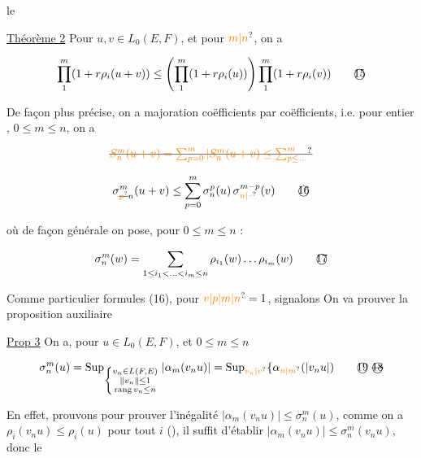  le

\uline{Théorème 2} Pour $u,v\in L_0(E,F)$,  et pour  $\unsure{m|n}$, on a

\[
\prod_1^m(1+r\rho_i(u+v))\leq\left(\prod_1^m(1+r\rho_i(u))\right)\prod_1^m(1+r\rho_i(v))\tag*{\textcircled{15}}
\]

De façon plus précise, on a majoration coëfficients par coëfficients, i.e. pour  entier  , $0\leq m\leq n$, on a

\[
\deleted{\unsure{S_n^m(u+v)=\sum_{p=0}^{m}|S_n^m(u+v)\leq\sum_{p\leq\ldots}^{m}}}
\]

\[
\sigma_{\deleted{\unsure{p}}n}^{m}(u+v)\leq\sum_{p=0}^m\sigma_n^p(u)\,\sigma_{\unsure{n|\text{--}}}^{m-p}(v)\tag*{\textcircled{16}}
\]


où de façon générale on pose, pour  $0\leq m\leq n$ :

\[
\sigma_n^m(w)=\sum_{1\leq i_1<\ldots<i_m\leq n}\rho_{i_1}(w)\ldots\rho_{i_m}(w)\tag*{\textcircled{17}}
\]

Comme  particulier  formules (16), pour $\unsure{v|p|m|n}=1$, signalons 
On va prouver la proposition auxiliaire

\uline{Prop 3} On a, pour $u\in L_0(E,F)$, et $0\leq m\leq n$

\[
\sigma_n^m(u)=\operatorname{Sup}_{\left\{\substack{v_n\in L(F,E)\\\lVert v_n\rVert\leq1\\\operatorname{rang}v_n\leq n}\right.}|\alpha_m(v_nu)|=\operatorname{Sup}_{\unsure{v_n|v}}\{\alpha_{\unsure{n|m}}(|v_nu|)\tag*{\textcircled{19}\ \deleted{\textcircled{18}}}
\]


En effet, prouvons   pour prouver l'inégalité  $|\alpha_m(v_nu)|\leq\sigma_n^m(u)$, comme on a $\rho_i(v_nu)\leq\rho_i(u)$ pour tout $i$ (\unsure{---}), il suffit d'établir $|\alpha_m(v_nu)|\leq\sigma_n^m(v_nu)$, donc le

